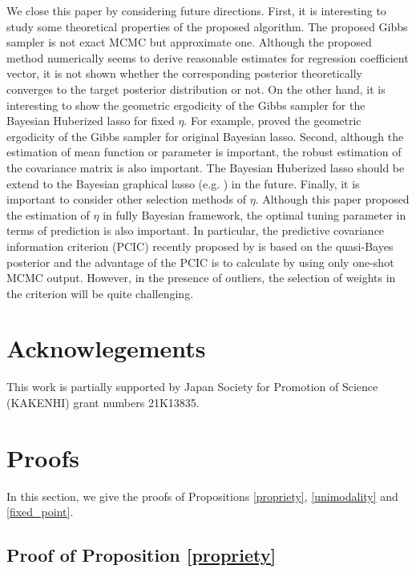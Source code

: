 \documentclass[11pt]{article}
\theoremstyle{plain}
\theoremstyle{definition}
\begin{document}
We close this paper by considering future directions. First, it is interesting to study some theoretical properties of the proposed algorithm. The proposed Gibbs sampler is not exact MCMC but approximate one. Although the proposed method numerically seems to derive reasonable estimates for regression coefficient vector, it is not shown whether the corresponding posterior theoretically converges to the target posterior distribution or not. On the other hand, it is interesting to show the geometric ergodicity of the Gibbs sampler for the Bayesian Huberized lasso for fixed $\eta$. For example, \cite{KH13} proved the geometric ergodicity of the Gibbs sampler for original Bayesian lasso. Second, although the estimation of mean function or parameter is important, the robust estimation of the covariance matrix is also important. The Bayesian Huberized lasso should be extend to the Bayesian graphical lasso (e.g. \cite{W12}) in the future. Finally, it is important to consider other selection methods of $\eta$. Although this paper proposed the estimation of $\eta$ in fully Bayesian framework, the optimal tuning parameter in terms of prediction is also important. In particular, the predictive covariance information criterion (PCIC) recently proposed by \cite{IY21} is based on the quasi-Bayes posterior and the advantage of the PCIC is to calculate by using only one-shot MCMC output. However, in the presence of outliers, the selection of weights in the criterion will be quite challenging.





\section*{Acknowlegements}

This work is partially supported by Japan Society for Promotion of Science (KAKENHI) grant numbers 21K13835.






\appendix



\section{Proofs}

In this section, we give the proofs of Propositions \ref{propriety}, \ref{unimodality} and \ref{fixed_point}. 

\subsection*{Proof of Proposition \ref{propriety}}
\end{document}
